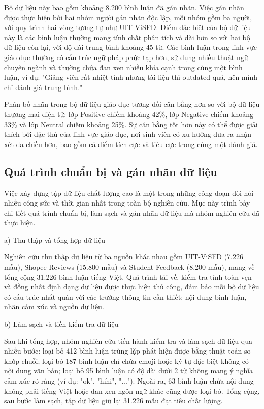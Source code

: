 \documentclass[14pt, a4paper]{report}
\begin{document}
Bộ dữ liệu này bao gồm khoảng 8.200 bình luận đã gán nhãn. Việc gán nhãn được thực hiện bởi hai nhóm người gán nhãn độc lập, mỗi nhóm gồm ba người, với quy trình hai vòng tương tự như UIT-ViSFD. Điểm đặc biệt của bộ dữ liệu này là các bình luận thường mang tính chất phân tích và dài hơn so với hai bộ dữ liệu còn lại, với độ dài trung bình khoảng 45 từ. Các bình luận trong lĩnh vực giáo dục thường có cấu trúc ngữ pháp phức tạp hơn, sử dụng nhiều thuật ngữ chuyên ngành và thường chứa đan xen nhiều khía cạnh trong cùng một bình luận, ví dụ: "Giảng viên rất nhiệt tình nhưng tài liệu thì outdated quá, nên mình chỉ đánh giá trung bình."


Phân bố nhãn trong bộ dữ liệu giáo dục tương đối cân bằng hơn so với bộ dữ liệu thương mại điện tử: lớp Positive chiếm khoảng 42\%, lớp Negative chiếm khoảng 33\% và lớp Neutral chiếm khoảng 25\%. Sự cân bằng tốt hơn này có thể được giải thích bởi đặc thù của lĩnh vực giáo dục, nơi sinh viên có xu hướng đưa ra nhận xét đa chiều hơn, bao gồm cả điểm tích cực và tiêu cực trong cùng một đánh giá.


\subsection{Quá trình chuẩn bị và gán nhãn dữ liệu}


Việc xây dựng tập dữ liệu chất lượng cao là một trong những công đoạn đòi hỏi nhiều công sức và thời gian nhất trong toàn bộ nghiên cứu. Mục này trình bày chi tiết quá trình chuẩn bị, làm sạch và gán nhãn dữ liệu mà nhóm nghiên cứu đã thực hiện.


a) Thu thập và tổng hợp dữ liệu


Nghiên cứu thu thập dữ liệu từ ba nguồn khác nhau gồm UIT-ViSFD (7.226 mẫu), Shopee Reviews (15.800 mẫu) và Student Feedback (8.200 mẫu), mang về tổng cộng 31.226 bình luận tiếng Việt. Quá trình tải về, kiểm tra tính toàn vẹn và đồng nhất định dạng dữ liệu được thực hiện thủ công, đảm bảo mỗi bộ dữ liệu có cấu trúc nhất quán với các trường thông tin cần thiết: nội dung bình luận, nhãn cảm xúc và nguồn dữ liệu.


b) Làm sạch và tiền kiểm tra dữ liệu


Sau khi tổng hợp, nhóm nghiên cứu tiến hành kiểm tra và làm sạch dữ liệu qua nhiều bước: loại bỏ 412 bình luận trùng lặp phát hiện được bằng thuật toán so khớp chuỗi; loại bỏ 187 bình luận chỉ chứa emoji hoặc ký tự đặc biệt không có nội dung văn bản; loại bỏ 95 bình luận có độ dài dưới 2 từ không mang ý nghĩa cảm xúc rõ ràng (ví dụ: "ok", "hihi", "..."). Ngoài ra, 63 bình luận chứa nội dung không phải tiếng Việt hoặc đan xen ngôn ngữ khác cũng được loại bỏ. Tổng cộng, sau bước làm sạch, tập dữ liệu giữ lại 31.226 mẫu đạt tiêu chất lượng.
\end{document}
